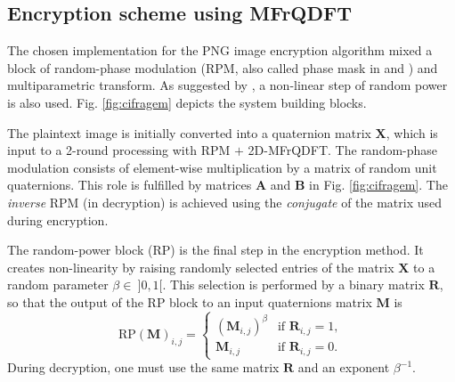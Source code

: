\subsection{Encryption scheme using MFrQDFT}

The chosen implementation for the PNG image encryption algorithm mixed a block of random-phase modulation (RPM, also called phase mask in \cite{chen2018multiple} and \cite{singh2008optical}) and multiparametric transform. As suggested by \cite{hsue2018enhancing}, a non-linear step of random power is also used. Fig. \ref{fig:cifragem} depicts the system building blocks.

The plaintext image is initially converted into a quaternion matrix $ \mathbf{X} $, which is input to a 2-round processing with RPM $ + $ 2D-MFrQDFT. The random-phase modulation consists of element-wise multiplication by a matrix of random unit quaternions. This role is fulfilled by matrices $ \mathbf{A} $ and $ \mathbf{B} $ in Fig. \ref{fig:cifragem}. The \textit{inverse} RPM (in decryption) is achieved using the \textit{conjugate} of the matrix used during encryption.

The random-power block (RP) is the final step in the encryption method. It creates non-linearity by raising randomly selected entries of the matrix $ \mathbf{X} $ to a random parameter $ \beta \in \ ]0,1[$. This selection is performed by a binary matrix $ \mathbf{R} $, so that the output of the RP block to an input quaternions matrix $ \mathbf{M} $ is
\begin{equation}
\text{RP}(\mathbf{M})_{i,j} =
\begin{cases}
(\mathbf{M}_{i,j})^\beta & \text{if } \mathbf{R}_{i,j} = 1, \\
\mathbf{M}_{i,j} & \text{if } \mathbf{R}_{i,j} = 0.
\end{cases}
\end{equation}
During decryption, one must use the same matrix $ \mathbf{R} $ and an exponent $ \beta^{-1} $.

